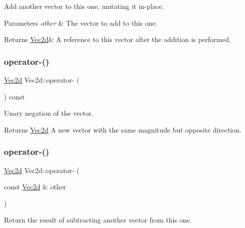 Add another vector to this one, mutating it in-\/place. 


\begin{DoxyParams}{Parameters}
{\em other} & The vector to add to this one. \\
\hline
\end{DoxyParams}
\begin{DoxyReturn}{Returns}
\hyperlink{classVec2d}{Vec2d}\& A reference to this vector after the addition is performed. 
\end{DoxyReturn}
\mbox{\label{classVec2d_a1e010b36566dfc5962ef7fe4c812347d}} 
\subsubsection{\texorpdfstring{operator-\/()}{operator-()}\hspace{0.1cm}{\footnotesize\ttfamily [1/2]}}
{\footnotesize\ttfamily \hyperlink{classVec2d}{Vec2d} Vec2d\+::operator-\/ (\begin{DoxyParamCaption}{ }\end{DoxyParamCaption}) const}



Unary negation of the vector. 

\begin{DoxyReturn}{Returns}
\hyperlink{classVec2d}{Vec2d} A new vector with the same magnitude but opposite direction. 
\end{DoxyReturn}
\mbox{\label{classVec2d_afc34295bf7a0686003c23f780f9798b4}} 
\subsubsection{\texorpdfstring{operator-\/()}{operator-()}\hspace{0.1cm}{\footnotesize\ttfamily [2/2]}}
{\footnotesize\ttfamily \hyperlink{classVec2d}{Vec2d} Vec2d\+::operator-\/ (\begin{DoxyParamCaption}\item[{const \hyperlink{classVec2d}{Vec2d} \&}]{other }\end{DoxyParamCaption})}



Return the result of subtracting another vector from this one. 


